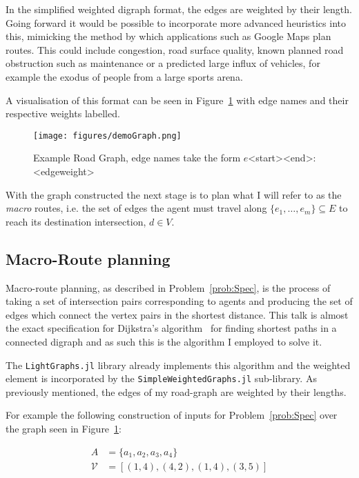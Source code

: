 In the simplified weighted digraph format, the edges are weighted by their length. Going forward it would be possible to incorporate more advanced heuristics into this, mimicking the method by which applications such as Google Maps plan routes. This could include congestion, road surface quality, known planned road obstruction such as maintenance or a predicted large influx of vehicles, for example the exodus of people from a large sports arena.

A visualisation of this format can be seen in Figure~\ref{fig:demoGraph} with edge names and their respective weights labelled.


\begin{figure}[ht]
  \centering
  \texttt{[image: figures/demoGraph.png]}
  \caption{\label{fig:demoGraph} Example Road Graph, edge names take the form $e$<start><end>: <edgeweight> }
\end{figure}


With the graph constructed the next stage is to plan what I will refer to as the \textit{macro} routes, i.e. the set of edges the agent must travel along $\{e_{1},\ldots,e_{m}\} \subseteq E$ to reach its destination intersection, $d \in V$.

\subsection{Macro-Route planning}

Macro-route planning, as described in Problem~\ref{prob:Spec}, is the process of taking a set of intersection pairs corresponding to agents and producing the set of edges which connect the vertex pairs in the shortest distance. This talk is almost the exact specification for Dijkstra's algorithm~\cite{dijkstra1959note} for finding shortest paths in a connected digraph and as such this is the algorithm I employed to solve it.

The \texttt{LightGraphs.jl} library already implements this algorithm and the weighted element is incorporated by the \texttt{SimpleWeightedGraphs.jl} sub-library. As previously mentioned, the edges of my road-graph are weighted by their lengths.

For example the following construction of inputs for Problem~\ref{prob:Spec} over the graph seen in Figure~\ref{fig:demoGraph}:

\begin{align*}
  A &= \{ a_{1},a_{2},a_{3},a_{4} \} \\
  \mathcal{V} &= [ (1,4), (4,2), (1,4), (3,5) ]
\end{align*}

